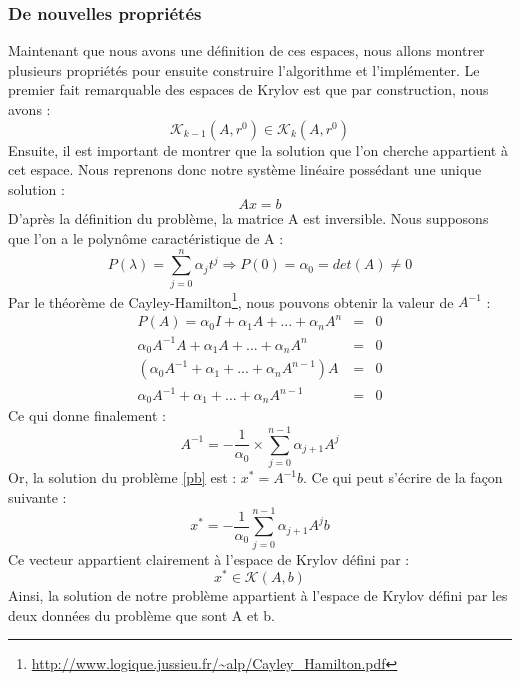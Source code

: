 \subsubsection{De nouvelles propriétés}
Maintenant que nous avons une définition de ces espaces, nous allons montrer plusieurs propriétés pour ensuite construire l'algorithme et l'implémenter. Le premier fait remarquable des espaces de Krylov est que par construction, nous avons :  
\begin{equation}
\mathcal{K}_{k - 1}(A, r^0) \in \mathcal{K}_k(A, r^0)
\end{equation}
Ensuite, il est important de montrer que la solution que l'on cherche appartient à cet espace. Nous reprenons donc notre système linéaire possédant une unique solution : 
\begin{equation}
Ax = b \label{pb}
\end{equation}
D'après la définition du problème, la matrice A est inversible. Nous supposons que l'on a le polynôme caractéristique de A :
\begin{equation}
P(\lambda) = \sum_{j = 0}^{n} \alpha_j t^j \Rightarrow P(0) = \alpha_0 = det(A) \neq 0
\end{equation}
Par le théorème de Cayley-Hamilton\footnote{\url{http://www.logique.jussieu.fr/~alp/Cayley_Hamilton.pdf}}, nous pouvons obtenir la valeur de $A^{-1}$ :
\begin{eqnarray}
P(A) = \alpha_0 I + \alpha_1 A + ... + \alpha_n A^n &=& 0 \\
\alpha_0 A^{-1}A + \alpha_1 A + ... + \alpha_n A^n &=& 0 \\
(\alpha_0 A^{-1} + \alpha_1  + ... + \alpha_n A^{n - 1})A &=& 0 \\
\alpha_0 A^{-1} + \alpha_1  + ... + \alpha_n A^{n - 1} &=& 0
\end{eqnarray}
Ce qui donne finalement :
\begin{equation}
 A^{-1} = - \frac{1}{\alpha_0} \times \sum_{j=0}^{n-1} \alpha_{j+1} A^j
\end{equation}
Or, la solution du problème \ref{pb} est : $x^* = A^{-1}b$. Ce qui peut s'écrire de la façon suivante : 
\begin{equation}
x^* = - \frac{1}{\alpha_0} \sum_{j=0}^{n-1} \alpha_{j+1} A^j b
\end{equation}
Ce vecteur appartient clairement à l'espace de Krylov défini par : 
\begin{equation}
x^* \in \mathcal{K}(A, b)
\end{equation}
Ainsi, la solution de notre problème appartient à l'espace de Krylov défini par les deux données du problème que sont A et b. 
